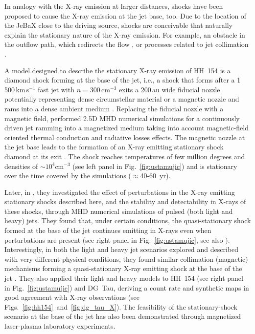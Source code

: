 In analogy with the X-ray emission at larger distances, shocks have been proposed to cause the X-ray emission at the jet base, too. Due to the location of the JeBaX close to the driving source, shocks  are conceivable that  naturally explain the stationary nature of the X-ray emission. For example, an obstacle in the outflow path, which redirects the flow \citep[either the magnetic field or the dense ambient medium, see][]{Bally_2003,Guenther_2014}, or processes related to jet collimation \citep[e.g.][]{Schneider_2011}. 

A model designed to describe the stationary X-ray emission of HH~154 is a diamond shock forming at the base of the jet, i.e., a shock that forms after a 1\,500\,km\,s$^{-1}$ fast jet with $n=300\,$cm$^{-3}$ exits a 200\,au wide fiducial nozzle potentially representing dense circumstellar material or a magnetic nozzle and rams into a dense ambient medium \citep[$n=3\times10^3\,$cm$^{-3}$,][]{Bonito_2011}. 
Replacing the fiducial nozzle with a magnetic field, \citet{Ustamujic_2016} performed  2.5D MHD numerical simulations for a continuously driven jet ramming into a magnetized medium taking into account magnetic-field oriented thermal conduction  and radiative losses effects. The magnetic nozzle at the jet base leads to the formation of an X-ray emitting stationary shock diamond at its exit  \citep[see 3D reconstruction in left panel in Fig.~\ref{fig:ustamujic} and][]{Ustamujic_2016}. The shock reaches temperatures of few million degrees and densities of $\sim 10^4$cm$^{-3}$ (see left panel in Fig.~\ref{fig:ustamujic}) and is stationary over the time covered by the simulations ($\approx$40-60~yr). 

Later, in \cite{Ustamujic_2018}, they investigated the effect of perturbations in the X-ray emitting stationary shocks described here, and the stability and detectability in X-rays of these shocks, through MHD numerical simulations of pulsed (both light and heavy) jets. They found that, under certain conditions, the quasi-stationary shock formed at the base of the jet continues emitting in X-rays even when perturbations are present (see right panel in Fig.~\ref{fig:ustamujic}, see also \cite{Ustamujic_2018}). Interestingly, in both the light and heavy jet scenarios explored and described with very different physical conditions, they found similar collimation (magnetic) mechanisms forming a quasi-stationary X-ray emitting shock at the base of the jet \cite{Ustamujic_2018}. They also applied their light and heavy models to HH~154 (see right panel in Fig.~\ref{fig:ustamujic}) and DG~Tau, deriving a count rate and synthetic maps in good agreement with X-ray observations (see Figs.~\ref{fig:hh154}~and~\ref{fig:dg_tau_X}).
The feasibility of the stationary-shock scenario at the base of the jet has also been demonstrated through magnetized laser-plasma laboratory experiments.

